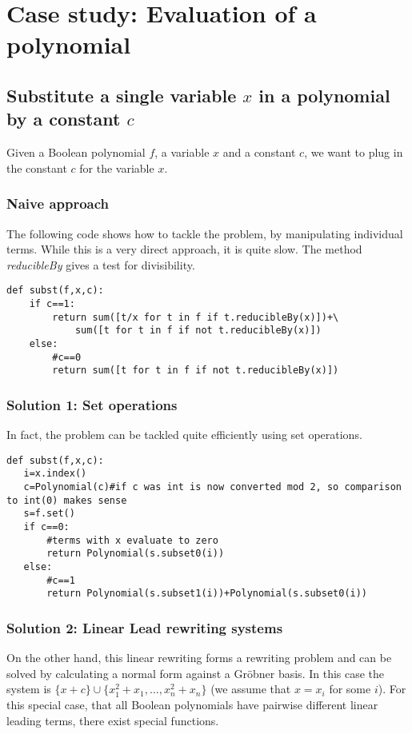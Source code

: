\documentclass[]{article}
\newcommand{\functionname}[1]{\textit{#1}\xspace}
\newcommand{\explfieldequations}{{x_1^2+x_1,\ldots,x_n^2+x_n}}
\begin{document}
\section{Case study: Evaluation of a polynomial}

\subsection{Substitute a single variable $x$ in a polynomial by a constant $c$}

Given a Boolean polynomial $f$, a variable $x$ and a constant $c$, we want to plug in the constant $c$ for the variable $x$.
\subsubsection{Naive approach}
The following code shows how to tackle the problem, by manipulating individual terms.
While this is a very direct approach, it is quite slow.
The method \functionname{reducibleBy} gives a test for divisibility.
\begin{verbatim}
def subst(f,x,c):
    if c==1:
        return sum([t/x for t in f if t.reducibleBy(x)])+\
            sum([t for t in f if not t.reducibleBy(x)])
    else:
        #c==0
        return sum([t for t in f if not t.reducibleBy(x)])

\end{verbatim}
\subsubsection{Solution 1: Set operations}
In fact, the problem can be tackled quite efficiently using set operations.
\begin{verbatim}
def subst(f,x,c):
   i=x.index()
   c=Polynomial(c)#if c was int is now converted mod 2, so comparison to int(0) makes sense
   s=f.set()
   if c==0:
       #terms with x evaluate to zero
       return Polynomial(s.subset0(i))
   else:
       #c==1
       return Polynomial(s.subset1(i))+Polynomial(s.subset0(i))    
\end{verbatim}
\subsubsection{Solution 2: Linear Lead rewriting systems}
On the other hand, this linear rewriting forms a rewriting problem and can be solved by calculating a normal form against a Gröbner basis.
In this case the system is $\{x+c\} \cup \{\explfieldequations\}$ (we assume that $x=x_i$ for some $i$).
For this special case, that all Boolean polynomials have pairwise different linear leading terms,
there exist special functions.
\end{document}

